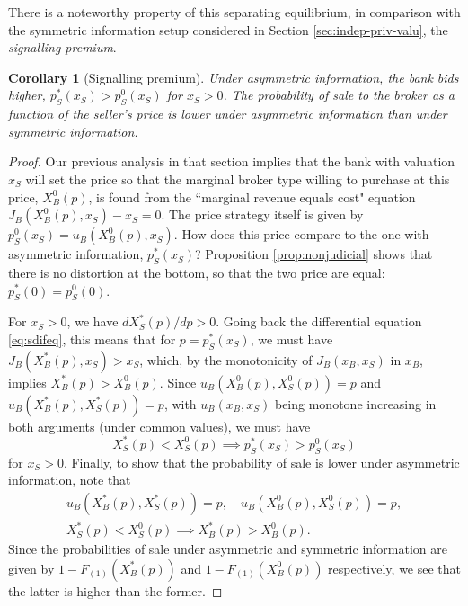 \documentclass[11pt,twopage]{article}
\newtheorem{remark}{Remark}
{\bf}{\it}
\newtheorem{corollary}{Corollary}
{\bf}{\it}
\begin{document}

There is a noteworthy property of this separating equilibrium, in
comparison with the symmetric information setup considered in Section
\ref{sec:indep-priv-valu}, the \emph{signalling premium}.
\begin{corollary}[Signalling premium]\label{cor:sp}
  Under asymmetric information, the bank bids higher, $p_S^*(x_S) >
  p_S^0(x_S)$ for $x_S>0$. The probability of sale to the broker as a function of the seller's
  price is \emph{lower} under asymmetric information than under symmetric information.
\end{corollary}
\begin{proof} Our previous analysis in that section implies that the
  bank with valuation $x_S$ will set the price so that the marginal
  broker type willing to purchase at this price, $X_B^0(p)$, is found
  from the ``marginal revenue equals cost" equation
  $J_B(X_B^0(p),x_S)-x_S=0$. The price strategy itself is given by
  $p_S^0(x_S) = u_B(X_B^0(p),x_S)$. How does this price compare to the
  one with asymmetric information, $p_S^*(x_S)$? Proposition
  \ref{prop:nonjudicial} shows that there is no distortion at the
  bottom, so that the two price are equal: $p_S^*(0) = p_S^0(0)$.

  For $x_S>0$, we have $d X_S^*(p)/dp>0$. Going back the differential
  equation \eqref{eq:sdifeq}, this means that for $p=p_S^*(x_S)$, we
  must have $J_B(X_B^*(p),x_S)>x_S$, which, by the monotonicity of
  $J_B(x_B,x_S)$ in $x_B$, implies $ X_B^*(p)>X_B^0(p)$. Since
  $u_B(X_B^0(p),X_S^0(p)) = p$ and $u_B(X_B^*(p),X_S^*(p)) = p$, with
  $u_B(x_B,x_S)$ being monotone increasing in both arguments (under
  common values), we must have \[ X_S^*(p)<X_S^0(p) \implies
  p_S^*(x_S) > p_S^0(x_S)\] for $x_S>0$. Finally, to show that the probability of sale is lower under asymmetric information, note that
  \begin{align*}
  u_B(X_B^*(p),X_S^*(p))=p,\quad u_B(X_B^0(p),X_S^0(p))=p,
  \\
 X_S^*(p)<X_S^0(p) \implies X_B^*(p)>X_B^0(p).
  \end{align*} 
  Since the probabilities of sale under asymmetric and symmetric information are given by $ 1-F_{(1)}(X_B^*(p))$ and $ 1 - F_{(1)}(X_B^0(p))$ respectively, we see that the latter is higher than the former. 
  \end{proof}
\end{document}
